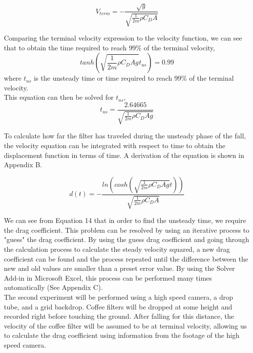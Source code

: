 \documentclass[12pt]{report}
\begin{document}
\begin{equation}
	V_{term} = -\frac{\sqrt{g}}{\sqrt{\frac{1}{2m}\rho C_D A}}
\end{equation}

\noindent Comparing the terminal velocity expression to the velocity function, we can see that to obtain the time required to reach $99\%$ of the terminal velocity,
\begin{equation}
	tanh(\sqrt{\frac{1}{2m}\rho C_D A g}t_{us}) = 0.99
\end{equation}
where $t_{us}$ is the unsteady time or time required to reach $99\%$ of the terminal velocity.\\

\noindent This equation can then be solved for $t_{us}$,
\begin{equation}
	t_{us}=\frac{2.64665}{\sqrt{\frac{1}{2m}\rho C_D A g}}
\end{equation}

\noindent To calculate how far the filter has traveled during the unsteady phase of the fall, the velocity equation can be integrated with respect to time to obtain the displacement function in terms of time. A derivation of the equation is shown in Appendix B.

\begin{equation}
	d(t) = -\frac{ln(cosh(\sqrt{\frac{1}{2m}\rho C_D A g}t))}{\sqrt{\frac{1}{2m}\rho C_D A}}
\end{equation}

\noindent We can see from Equation 14 that in order to find the unsteady time, we require the drag coefficient. This problem can be resolved by using an iterative process to "guess" the drag coefficient. By using the guess drag coefficient and going through the calculation process to calculate the steady velocity squared, a new drag coefficient can be found and the process repeated until the difference between the new and old values are smaller than a preset error value. By using the Solver Add-in in Microsoft Excel, this process can be performed many times automatically (See Appendix C).\\

\noindent The second experiment will be performed using a high speed camera, a drop tube, and a grid backdrop. Coffee filters will be dropped at some height and recorded right before touching the ground. After falling for this distance, the velocity of the coffee filter will be assumed to be at terminal velocity, allowing us to calculate the drag coefficient using information from the footage of the high speed camera. \\ 
\end{document}
